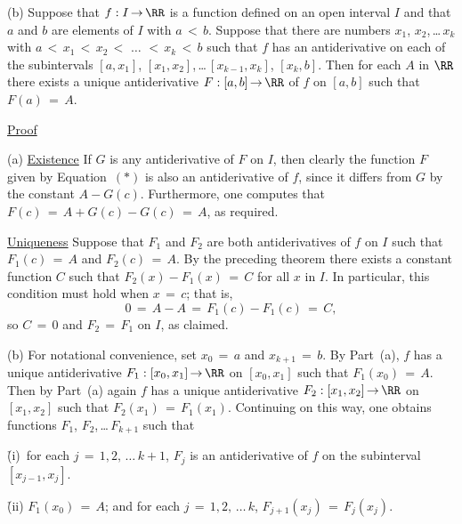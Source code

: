 {\V

        (b) Suppose that $f:I \,{\rightarrow}\, {\RR}$ is a function defined on an open interval $I$ and that $a$ and $b$ are elements of $I$ with $a\,<\,b$.
    Suppose that there are numbers $x_{1}$, $x_{2}$,\,{\ldots}\,$x_{k}$ with $a\,<\,x_{1}\,<\,x_{2}\,<\,\,{\ldots}\,\,<\,x_{k}\,<\,b$ such that $f$ has an antiderivative on each of the subintervals $[a,x_{1}]$, $[x_{1},x_{2}]$,\,{\ldots}\,$[x_{k-1},x_{k}]$, $[x_{k},b]$.
    Then for each $A$ in ${\RR}$ there exists a unique antiderivative $F:[a,b] \,{\rightarrow}\, {\RR}$ of $f$ on $[a,b]$ such that $F(a) \,=\, A$.
\V

        \underline{Proof}

        (a) \underline{Existence} If $G$ is any antiderivative of $F$ on $I$, then clearly the function $F$ given by Equation~$({\ast})$ is also an antiderivative of $f$, since it differs from $G$ by the constant $A-G(c)$.
    Furthermore, one computes that $F(c) \,=\, A+G(c)-G(c) \,=\, A$, as required.

        \underline{Uniqueness} Suppose that $F_{1}$ and $F_{2}$ are both antiderivatives of $f$ on $I$ such that $F_{1}(c) \,=\, A$ and $F_{2}(c) \,=\, A$.
    By the preceding theorem there exists a constant function $C$ such that $F_{2}(x) - F_{1}(x) \,=\, C$ for all $x$ in $I$.
    In particular, this condition must hold when $x \,=\, c$; that is,
        \begin{displaymath}
        0 \,=\, A-A \,=\, F_{1}(c)-F_{1}(c) \,=\, C,
        \end{displaymath}
    so $C \,=\, 0$ and $F_{2} \,=\, F_{1}$ on $I$, as claimed.

\V

        (b) For notational convenience, set $x_{0} \,=\, a$ and $x_{k+1} \,=\, b$.
    By Part~(a), $f$ has a unique antiderivative $F_{1}:[x_{0},x_{1}] \,{\rightarrow}\, {\RR}$ on $[x_{0},x_{1}]$ such that $F_{1}(x_{0}) \,=\, A$.
     Then by Part~(a) again $f$ has a unique antiderivative $F_{2}:[x_{1},x_{2}] \,{\rightarrow}\, {\RR}$ on $[x_{1},x_{2}]$ such that $F_{2}(x_{1}) \,=\, F_{1}(x_{1})$.
    Continuing on this way, one obtains functions $F_{1}$, $F_{2}$,\,{\ldots}\,$F_{k+1}$ such that

        \h (i)\, for each $j \,=\, 1,2,\,{\ldots}\,k+1$, $F_{j}$ is an antiderivative of $f$ on the subinterval $[x_{j-1},x_{j}]$.

        \h (ii) $F_{1}(x_{0}) \,=\, A$; and for each $j \,=\, 1,2,\,{\ldots}\,k$, $F_{j+1}(x_{j}) \,=\, F_{j}(x_{j})$.

}
